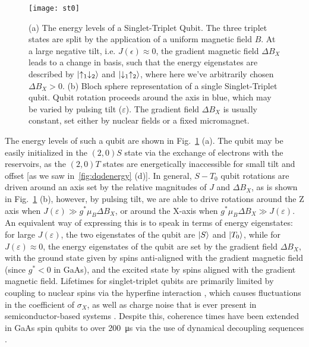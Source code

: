 \begin{figure}
\texttt{[image: st0]}
\caption[Energy levels and eigenstates of a Singlet-Triplet qubit]
{\label{fig:st0}(a) The energy levels of a Singlet-Triplet Qubit. The three triplet states are split by the application of a
uniform magnetic field $B$. At a large negative tilt, i.e. $J(\epsilon) \approx 0$, the gradient magnetic field $\Delta B_X$ leads to a
change in basis, such that the energy eigenstates are described by $\ket{\uparrow_1\downarrow_2}$ and $\ket{\downarrow_1\uparrow_2}$,
where here we've arbitrarily chosen $\Delta B_X > 0$.
(b) Bloch sphere representation of a single Singlet-Triplet qubit. Qubit rotation proceeds around the axis in blue,
which may be varied by pulsing tilt ($\varepsilon$). The gradient field $\Delta B_X$ is usually constant, set either
by nuclear fields or a fixed micromagnet.}
\end{figure}

The energy levels of such a qubit are shown in Fig.~\ref{fig:st0} (a). The qubit may be easily initialized in the $(2, 0)S$ state via
the exchange of electrons with the reservoirs, as the $(2, 0)T$ states are energetically inaccessible for small tilt and offset [as we
saw in~\ref{fig:dqdenergy} (d)]. In general, $S-T_0$ qubit rotations are driven around an axis set by the relative magnitudes
of $J$ and $\Delta B_X$, as is shown in Fig.~\ref{fig:st0} (b), however, by pulsing tilt, we are able to drive rotations around the Z axis
when $J(\varepsilon) \gg g^* \mu_B \Delta B_X$, or around the X-axis when $g^* \mu_B \Delta B_X \gg J(\varepsilon)$. An equivalent way of
expressing this is to speak in terms of energy eigenstates: for large $J(\varepsilon)$, the two eigenstates of the qubit are $\ket{S}$ and
$\ket{T_0}$, while for $J(\varepsilon) \approx 0$, the energy eigenstates of the qubit are set by the gradient field $\Delta B_X$, with
the ground state given by spins anti-aligned with the gradient magnetic field (since $g^* < 0$ in GaAs), and the excited state by spins aligned with
the gradient magnetic field. Lifetimes for singlet-triplet qubits are primarily limited by coupling to nuclear spins via the hyperfine
interaction \cite{nnano.2016.170}, which causes fluctuations in the coefficient of $\sigma_X$, as well as charge noise that is ever present
in semiconductor-based systems \cite{PhysRevLett.110.146804}. Despite this, coherence times have been extended in GaAs spin qubits to
over \SI{200}{\micro\second} via the use of dynamical decoupling sequences \cite{nphys1856}.

